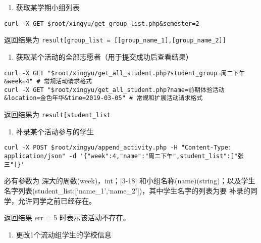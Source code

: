 \documentclass[]{article}
\providecommand{\tightlist}{%
  \setlength{\itemsep}{0pt}\setlength{\parskip}{0pt}}
\begin{document}
\begin{enumerate}
\def\labelenumi{\arabic{enumi}.}
\setcounter{enumi}{4}
\tightlist
\item
  获取某学期小组列表
\end{enumerate}

\begin{verbatim}
curl -X GET $root/xingyu/get_group_list.php&semester=2
\end{verbatim}

返回结果为
\texttt{result{[}\textquotesingle{}group\_list\textquotesingle{}{]}\ =\ {[}{[}group\_name\_1{]},{[}group\_name\_2{]}{]}}

\begin{enumerate}
\def\labelenumi{\arabic{enumi}.}
\setcounter{enumi}{5}
\tightlist
\item
  获取某个活动的全部志愿者（用于提交成功后查看结果）
\end{enumerate}

\begin{verbatim}
curl -X GET "$root/xingyu/get_all_student.php?student_group=周二下午&week=4" # 常规活动请求格式
curl -X GET "$root/xingyu/get_all_student.php?name=前期体验活动&location=金色年华&time=2019-03-05" # 常规和扩展活动请求格式
\end{verbatim}

返回结果为
\texttt{result{[}\textquotesingle{}student\_list\textquotesingle{}{]}}

\begin{enumerate}
\def\labelenumi{\arabic{enumi}.}
\setcounter{enumi}{6}
\tightlist
\item
  补录某个活动参与的学生
\end{enumerate}

\begin{verbatim}
curl -X POST $root/xingyu/append_activity.php -H "Content-Type: application/json" -d '{"week":4,"name":"周二下午",student_list":["张三"]}'
\end{verbatim}

必有参数为 深大的周数(week)，int；{[}3-18{]}
和小组名称(name)(string)；以及学生名字列表(student\_list:{[}`name\_1',`name\_2'{]})，其中学生名字的列表为要
补录的同学，允许同学之前已经存在。

返回结果 err = 5 时表示该活动不存在。

\begin{enumerate}
\def\labelenumi{\arabic{enumi}.}
\setcounter{enumi}{7}
\tightlist
\item
  更改1个流动组学生的学校信息
\end{enumerate}
\end{document}
